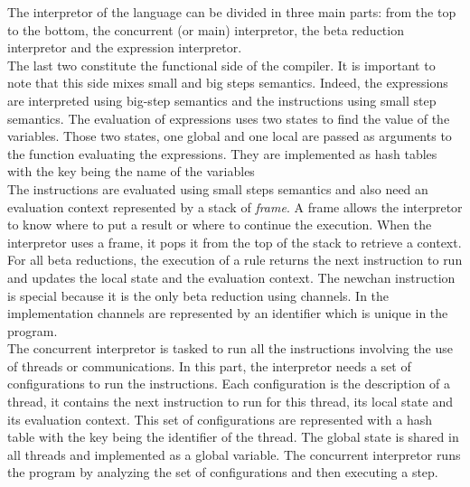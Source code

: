 \documentclass[11pt]{report}
\begin{document}
{}
\vspace*{3pt}
\vspace*{10pt}

\tabto{1cm}The interpretor of the language can be divided in three main parts: from the top to the bottom, the concurrent (or main) interpretor, the beta reduction interpretor and the expression interpretor. \\

\tabto{1cm}The last two constitute the functional side of the compiler. It is important to note that this side mixes small and big steps semantics. Indeed, the expressions are interpreted using big-step semantics and the instructions using small step semantics. The evaluation of expressions uses two states to find the value of the variables. Those two states, one global and one local are passed as arguments to the function evaluating the expressions. They are implemented as hash tables with the key being the name of the variables\\

\tabto{1cm}The instructions are evaluated using small steps semantics and also need an evaluation context represented by a stack of \textit{frame}. A frame allows the interpretor to know where to put a result or where to continue the execution. When the interpretor uses a frame, it pops it from the top of the stack to retrieve a context. For all beta reductions, the execution of a rule returns the next instruction to run and updates the local state and the evaluation context.
The newchan instruction is special because it is the only beta reduction using channels. In the implementation channels are represented by an identifier which is unique in the program. \\

\tabto{1cm} The concurrent interpretor is tasked to run all the instructions involving the use of threads or communications. In this part, the interpretor needs a set of configurations to run the instructions. Each configuration is the description of a thread, it contains the next instruction to run for this thread, its local state and its evaluation context. This set of configurations are represented with a hash table with the key being the identifier of the thread. The global state is shared in all threads and implemented as a global variable. The concurrent interpretor runs the program by analyzing the set of configurations and then executing a step. \\
\end{document}
